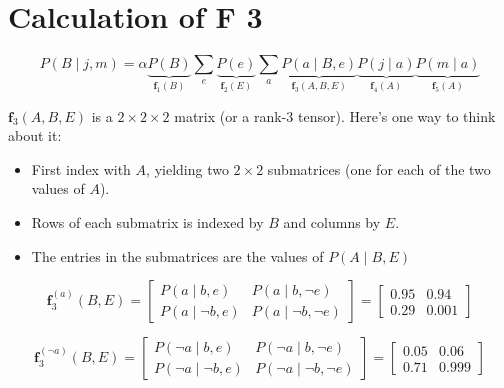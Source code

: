 \documentclass[11pt]{article}
\begin{document}
\section{Calculation of F 3}
\label{sec:org8a87f98}

\begin{equation*}
P(B \mid j, m) =
\alpha \underbrace{P(B)}_{\bm{f}_1(B)}
\sum_e
\underbrace{P(e)}_{\bm{f}_2(E)}
\sum_a
\underbrace{P(a \mid B, e)}_{\bm{f}_3(A,B,E)}
\underbrace{P(j \mid a)}_{\bm{f}_4(A)}
\underbrace{P(m \mid a)}_{\bm{f}_5(A)}
\end{equation*}

\(\bm{f}_3(A, B, E)\) is a \(2 \times 2 \times 2\) matrix (or a rank-3 tensor).  Here's one way to think about it:

\begin{itemize}
\item First index with \(A\), yielding two \(2 \times 2\) submatrices (one for each of the two values of \(A\)).
\item Rows of each submatrix is indexed by \(B\) and columns by \(E\).
\item The entries in the submatrices are the values of \(P(A \mid B, E)\)
\end{itemize}



\begin{equation*}
\bm{f}_{3}^{(a)} (B, E) =
\begin{bmatrix}
P(a \mid b,e) & P(a \mid b, \neg e) \\
P(a \mid \neg b, e) & P(a \mid \neg b, \neg e)
\end{bmatrix}
=
\begin{bmatrix}
0.95 & 0.94\\
0.29 & 0.001
\end{bmatrix}
\end{equation*}

\begin{equation*}
\bm{f}_{3}^{(\neg a)} (B, E) =
\begin{bmatrix}
P(\neg a \mid b,e) & P(\neg a \mid b, \neg e) \\
P(\neg a \mid \neg b, e) & P(\neg a \mid \neg b, \neg e)
\end{bmatrix}
=
\begin{bmatrix}
0.05 & 0.06\\
0.71 & 0.999
\end{bmatrix}
\end{equation*}
\end{document}
